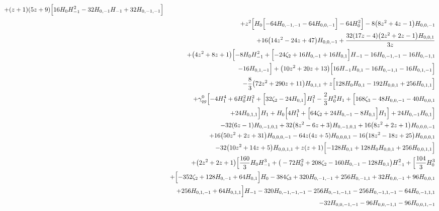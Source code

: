 \begin{eqnarray}
+(z+1) (5 z+9)\Bigl[16  H_0 H_{-1}^2-32  H_{0,-1} H_{-1}+32 H_{0,-1,-1}\Bigr]
\nonumber \\ &&
+z^2 \Bigl[H_0 \Bigl[-64 H_{0,-1,-1}-64 H_{0,0,-1}\Bigr]-64 H_0^2\Bigr]-8 \big(8 z^2+4 z-1\big) H_{0,0,-1}
\nonumber \\ &&
+16  \big(14 z^2-24z+47\big) H_{0,0,-1}+\frac{32 (17 z-4) \big(2 z^2+2 z-1\big) H_{0,0,1}}{3  z}
\nonumber \\ &&
+\big(4 z^2+8 z+1\big) \Bigl[-8 H_0 H_{-1}^2+\Bigl[-24 \zeta_2+16H_{0,-1}+16 H_{0,1}\Bigr] H_{-1}-16 H_{0,-1,-1}-16 H_{0,-1,1}
\nonumber \\ &&
-16H_{0,1,-1}\Bigr]+\big(10 z^2+20 z+13\big) \Bigl[16  H_{-1} H_{0,1}-16 H_{0,-1,1}-16  H_{0,1,-1}\Bigr]
\nonumber \\ &&
-\frac{8}{3} \big(72 z^2+290 z+11\big) H_{0,1,1}+z \Bigl[128  H_0 H_{0,1}-192  H_{0,0,1}+256 H_{0,1,1}\Bigr]
\nonumber \\ &&
+{\gamma}_{qg}^{0} \Bigl[-4 H_1^4+6 H_0^2H_1^2+\Bigl[32 \zeta_2-24 H_{0,1}\Bigr] H_1^2-\frac{2}{3} H_0^3H_1+\Bigl[168 \zeta_3-48 H_{0,0,-1}-40 H_{0,0,1}
\nonumber \\ &&
+24 H_{0,1,1}\Bigr] H_1+H_0\Bigl[4 H_1^3+\Bigl[64 \zeta_2+24 H_{0,-1}-8 H_{0,1}\Bigr] H_1\Bigr]+24H_{0,-1} H_{0,1}\Bigr]
\nonumber \\ &&
-32  (6 z-1) H_{0,-1,0,1}+32 \big(8 z^2-6 z+3\big)H_{0,-1,0,1}+16 \big(8 z^2+2 z+1\big) H_{0,0,0,-1}
\nonumber \\ &&
+16  \big(50 z^2+2z+31\big) H_{0,0,0,-1}-64  z (4 z+5) H_{0,0,0,1}-16 \big(18 z^2-18z+25\big) H_{0,0,0,1}
\nonumber \\ &&
-32 \big(10 z^2+14 z+5\big) H_{0,0,1,1}+z (z+1) \Bigl[-128 H_{0,1}+128  H_0 H_{0,0,1}+256  H_{0,0,1,1}\Bigr]
\nonumber \\ &&
+\big(2z^2+2 z+1\big) \Bigl[\frac{160}{3} H_0 H_{-1}^3+\big(-72 H_0^2+208 \zeta_2
-160 H_{0,-1}-128 H_{0,1}\big)H_{-1}^2
+\Bigl[\frac{104}{3} H_0^3
\nonumber \\ &&
+\Bigl[-352 \zeta_2+128 H_{0,-1}+64 H_{0,1}\Bigr]H_0-384 \zeta_3
+320H_{0,-1,-1}+256 H_{0,-1,1}+32 H_{0,0,-1}+96 H_{0,0,1}
\nonumber \\ &&
+256 H_{0,1,-1}+64H_{0,1,1}\Bigr] H_{-1}-320 H_{0,-1,-1,-1}
-256 H_{0,-1,-1,1}-256 H_{0,-1,1,-1}-64 H_{0,-1,1,1}
\nonumber \\ &&
-32 H_{0,0,-1,-1}
-96H_{0,0,-1,1}-96 H_{0,0,1,-1}

\end{eqnarray}
